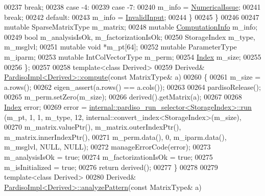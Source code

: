 \begin{DoxyCode}
00237           \textcolor{keywordflow}{break};
00238         \textcolor{keywordflow}{case} -4:
00239         \textcolor{keywordflow}{case} -7:
00240           m\_info = \hyperlink{group__enums_gga85fad7b87587764e5cf6b513a9e0ee5eaaf9b736d310a664e7729d163a035cc5f}{NumericalIssue};
00241           \textcolor{keywordflow}{break};
00242         \textcolor{keywordflow}{default}:
00243           m\_info = \hyperlink{group__enums_gga85fad7b87587764e5cf6b513a9e0ee5ea945604f62795ffc70aedf2bd12ea0434}{InvalidInput};
00244       \}
00245     \}
00246 
00247     \textcolor{keyword}{mutable} SparseMatrixType m\_matrix;
00248     \textcolor{keyword}{mutable} \hyperlink{group__enums_ga85fad7b87587764e5cf6b513a9e0ee5e}{ComputationInfo} m\_info;
00249     \textcolor{keywordtype}{bool} m\_analysisIsOk, m\_factorizationIsOk;
00250     StorageIndex m\_type, m\_msglvl;
00251     \textcolor{keyword}{mutable} \textcolor{keywordtype}{void} *m\_pt[64];
00252     \textcolor{keyword}{mutable} ParameterType m\_iparm;
00253     \textcolor{keyword}{mutable} IntColVectorType m\_perm;
00254     \hyperlink{namespace_eigen_a62e77e0933482dafde8fe197d9a2cfde}{Index} m\_size;
00255     
00256 \};
00257 
00258 \textcolor{keyword}{template}<\textcolor{keyword}{class} Derived>
00259 Derived& \hyperlink{class_eigen_1_1_pardiso_impl}{PardisoImpl<Derived>::compute}(\textcolor{keyword}{const} MatrixType& a)
00260 \{
00261   m\_size = a.rows();
00262   eigen\_assert(a.rows() == a.cols());
00263 
00264   pardisoRelease();
00265   m\_perm.setZero(m\_size);
00266   derived().getMatrix(a);
00267   
00268   \hyperlink{namespace_eigen_a62e77e0933482dafde8fe197d9a2cfde}{Index} error;
00269   error = \hyperlink{struct_eigen_1_1internal_1_1pardiso__run__selector}{internal::pardiso\_run\_selector<StorageIndex>::run}
      (m\_pt, 1, 1, m\_type, 12, internal::convert\_index<StorageIndex>(m\_size),
00270                                                             m\_matrix.valuePtr(), m\_matrix.outerIndexPtr(), 
      m\_matrix.innerIndexPtr(),
00271                                                             m\_perm.data(), 0, m\_iparm.data(), m\_msglvl, 
      NULL, NULL);
00272   manageErrorCode(error);
00273   m\_analysisIsOk = \textcolor{keyword}{true};
00274   m\_factorizationIsOk = \textcolor{keyword}{true};
00275   m\_isInitialized = \textcolor{keyword}{true};
00276   \textcolor{keywordflow}{return} derived();
00277 \}
00278 
00279 \textcolor{keyword}{template}<\textcolor{keyword}{class} Derived>
00280 Derived& \hyperlink{class_eigen_1_1_pardiso_impl_af1773ce06014b55a69cd42daf34eeec4}{PardisoImpl<Derived>::analyzePattern}(\textcolor{keyword}{const} MatrixType& a)

\end{DoxyCode}
